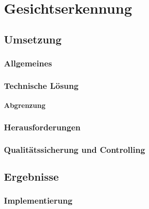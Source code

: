 \chapter{Gesichtserkennung}
\section{Umsetzung}
\subsection{Allgemeines}
\subsection{Technische Lösung}
\subsubsection{Abgrenzung}
\subsection{Herausforderungen}
\subsection{Qualitätssicherung und Controlling}
\section{Ergebnisse}
\subsection{Implementierung}

\label{\docname}

